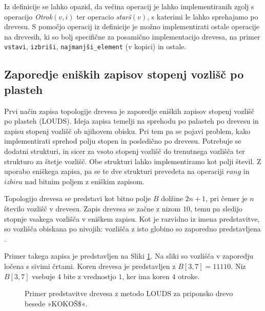 Iz definicije se lahko opazid, da večina operacij je lahko implementiranih zgolj s operacijo \textit{Otrok}$(v,i)$ ter operacio \textit{starš}$(v)$, s katerimi le lahko sprehajamo po drevesu. S pomočjo operacij iz definicije je možno implementirati ostale operacije na drevesih, ki so bolj specifične za posamično implementacijo drevesa, na primer \texttt{vstavi}, \texttt{izbriši}, \texttt{najmanjši\_element} (v kopici) in ostale.

\subsection{Zaporedje eniških zapisov stopenj vozlišč po plasteh}\label{sec:LOUDS}

Prvi način zapisa topologije drevesa je zaporedje eniških zapisov stopenj vozlišč po plasteh (LOUDS). Ideja zapisa temelji na sprehodu po palasteh po drevesu in zapisu stopenj vozlišč ob njihovem obisku. Pri tem pa se pojavi problem, kako implementirati sprehod polju stopen in posledično po drevesu. Potrebuje se dodatni strukturi, in sicer za vsoto stopenj vozlišč do trenutnega vozlišča ter strukturo za štetje vozlišč. Obe strukturi lahko implementiramo kot polji števil. Z uporabo eniškega zapisa, pa se te dve strukturi prevedeta na operaciji $rang$ in $izbira$ nad bitnim poljem z eniškim zapisom.    

Topologijo drevesa se predstavi kot bitno polje $B$ dolžine $2n+1$, pri čemer je $n$ število vozlišč v drevesu. Zapis drevesa se začne z nizom $10$, temu pa sledijo stopnje vsakega vozlišča v eniškem zapisu. Kot je razvidno iz imena predstavitve, so vozlišča obiskana po nivojih: vozlišča z isto globino so zaporedno predstavljena \cite{Navarro2016}.

Primer takega zapisa je predstavljen na Sliki \ref{fig:LOUDS}. Na sliki so vozlišča v zaporedju ločena s sivimi črtami. Koren drevesa je predstavljen z $B[3,7]=11110$. Niz $B[3,7]$ vsebuje 4 bite z vrednostjo $1$, ker ima koren $4$ otroke.

\begin{figure}[htb]
    \begin{center}
        
        \caption{Primer predstavitve drevesa z metodo LOUDS za priponsko drevo besede »KOKOŠ$\$$«.} 
        \label{fig:LOUDS}
    \end{center}
\end{figure}

